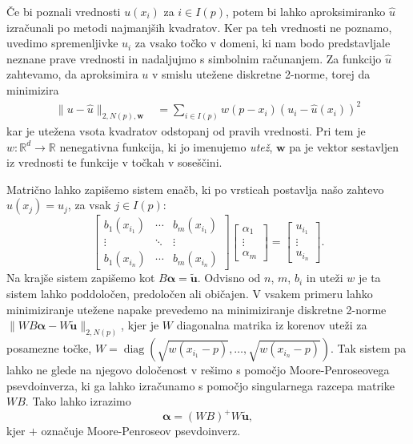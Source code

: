 \documentclass[12pt,a4paper]{article}
\theoremstyle{definition} %
\theoremstyle{plain} %
\numberwithin{equation}{section}
\newcommand{\R}{\mathbb R}
\renewcommand{\b}{\boldsymbol}
\newcommand{\uh}{\hat{u}}
\DeclareMathOperator{\diag}{diag}
\begin{document}
Če bi poznali vrednosti $u(x_i)$ za $i \in I(p)$, potem bi lahko aproksimiranko
$\uh$ izračunali po metodi najmanjših kvadratov. Ker pa teh vrednosti ne
poznamo, uvedimo spremenljivke $u_i$ za vsako točko v domeni, ki nam bodo
predstavljale neznane prave vrednosti in nadaljujmo
s simbolnim računanjem. Za funkcijo $\uh$ zahtevamo, da aproksimira $u$ v smislu
utežene diskretne 2-norme, torej da minimizira
\begin{align*}
  \|u-\uh\|_{2,N(p),\b{w}} &= \sum_{i\in I(p)} w(p-x_i) (u_i - \uh(x_i))^2
\end{align*}
kar je utežena vsota kvadratov odstopanj od pravih vrednosti. Pri tem je
$w\colon\R^d\to\R$ nenegativna funkcija, ki jo imenujemo \emph{utež}, $\b{w}$ pa
je vektor sestavljen iz vrednosti te funkcije v točkah v soseščini.

Matrično lahko zapišemo sistem enačb, ki po vrsticah
postavlja našo zahtevo $\hat{u}(x_j) = u_j$, za vsak $j \in I(p)$:
\begin{equation}
\begin{bmatrix}
  b_1(x_{i_1}) & \cdots & b_m(x_{i_1}) \\
  \vdots & \ddots & \vdots   \\
  b_1(x_{i_n}) & \cdots & b_m(x_{i_n})
\end{bmatrix}
\begin{bmatrix}
  \alpha_1 \\ \vdots \\ \alpha_m
\end{bmatrix}
=
\begin{bmatrix}
  u_{i_1} \\ \vdots \\ u_{i_n}
\end{bmatrix}.
  \label{eq:shape-system}
\end{equation}
Na krajše sistem zapišemo kot $B\b{\alpha} = \b{\tilde{u}}$. Odvisno od
$n$, $m$, $b_i$ in uteži $w$ je ta sistem lahko poddoločen, predoločen ali
običajen. V vsakem primeru lahko minimiziranje utežene napake prevedemo na
minimiziranje diskretne 2-norme $\|WB\b{\alpha}-W\b{\tilde{u}}\|_{2,N(p)}$, kjer je $W$
diagonalna matrika iz korenov uteži za posamezne točke, $W =
\diag(\sqrt{w(x_{i_1}-p)}, \dots, \sqrt{w(x_{i_n}-p)})$. Tak sistem pa lahko ne
glede na njegovo določenost v rešimo s pomočjo Moore-Penroseovega
psevdoinverza, ki ga lahko izračunamo s pomočjo singularnega razcepa matrike
$WB$.
Tako lahko izrazimo \[ \b{\alpha} = (WB)^{+}W\b{\tilde u}, \]
kjer $+$ označuje Moore-Penroseov psevdoinverz.
\end{document}
